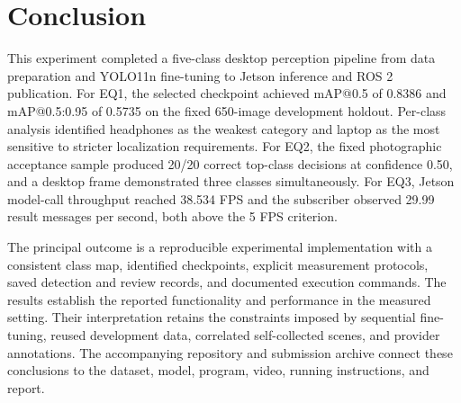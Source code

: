 \documentclass[12pt,a4paper]{article}
\makeatletter
\newcommand{\mAPfifty}{mAP@0.5}
\newcommand{\mAPcoco}{mAP@0.5:0.95}
\makeatother
\begin{document}
\FloatBarrier
{}
\section{Conclusion}

This experiment completed a five-class desktop perception pipeline from data preparation and YOLO11n fine-tuning to Jetson inference and ROS 2 publication. For EQ1, the selected checkpoint achieved \mAPfifty{} of 0.8386 and \mAPcoco{} of 0.5735 on the fixed 650-image development holdout. Per-class analysis identified headphones as the weakest category and laptop as the most sensitive to stricter localization requirements. For EQ2, the fixed photographic acceptance sample produced 20/20 correct top-class decisions at confidence 0.50, and a desktop frame demonstrated three classes simultaneously. For EQ3, Jetson model-call throughput reached 38.534 FPS and the subscriber observed 29.99 result messages per second, both above the 5 FPS criterion.

The principal outcome is a reproducible experimental implementation with a consistent class map, identified checkpoints, explicit measurement protocols, saved detection and review records, and documented execution commands. The results establish the reported functionality and performance in the measured setting. Their interpretation retains the constraints imposed by sequential fine-tuning, reused development data, correlated self-collected scenes, and provider annotations. The accompanying repository and submission archive connect these conclusions to the dataset, model, program, video, running instructions, and report.

\FloatBarrier
\clearpage
\begingroup
\fontsize{9pt}{10.2pt}\selectfont
{}
\setlength{\bibsep}{0pt}


\endgroup
\end{document}
